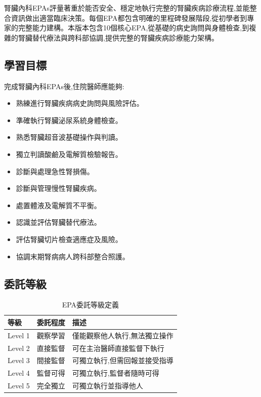 \documentclass[12pt,a4paper]{article}
\newcommand{\note}[1]{
    \par
    \noindent
    \begin{tcolorbox}[
        colback=nephro_cyan!5!white,
        colframe=nephro_cyan,
        title=\textbf{重點提醒},
        fonttitle=\bfseries,
        boxrule=0.5pt,
        arc=3pt,
        left=6pt,
        right=6pt,
        top=6pt,
        bottom=6pt
    ]
    #1
    \end{tcolorbox}
}
\begin{document}
\vspace{0.5cm}
\note{
腎臟內科EPAs評量著重於能否安全、穩定地執行完整的腎臟疾病診療流程,並能整合資訊做出適當臨床決策。每個EPA都包含明確的里程碑發展階段,從初學者到專家的完整能力建構。本版本包含10個核心EPA,從基礎的病史詢問與身體檢查,到複雜的腎臟替代療法與跨科部協調,提供完整的腎臟疾病診療能力架構。
}

\subsection{學習目標}
完成腎臟內科EPAs後,住院醫師應能夠:
\begin{itemize}[nosep]
    \item 熟練進行腎臟疾病病史詢問與風險評估。
    \item 準確執行腎臟泌尿系統身體檢查。
    \item 熟悉腎臟超音波基礎操作與判讀。
    \item 獨立判讀酸鹼及電解質檢驗報告。
    \item 診斷與處理急性腎損傷。
    \item 診斷與管理慢性腎臟疾病。
    \item 處置體液及電解質不平衡。
    \item 認識並評估腎臟替代療法。
    \item 評估腎臟切片檢查適應症及風險。
    \item 協調末期腎病病人跨科部整合照護。
\end{itemize}

\subsection{委託等級}
\begin{table}[h]
    \centering
    \caption{EPA委託等級定義}
    \begin{tabular}{p{2cm} p{3cm} p{9cm}}
        \toprule
        \textbf{等級} & \textbf{委託程度} & \textbf{描述} \\
        \midrule
        Level 1 & 觀察學習 & 僅能觀察他人執行,無法獨立操作 \\
        Level 2 & 直接監督 & 可在主治醫師直接監督下執行 \\
        Level 3 & 間接監督 & 可獨立執行,但需回報並接受指導 \\
        Level 4 & 監督可得 & 可獨立執行,監督者隨時可得 \\
        Level 5 & 完全獨立 & 可獨立執行並指導他人 \\
        \bottomrule
    \end{tabular}
\end{table}
\end{document}
